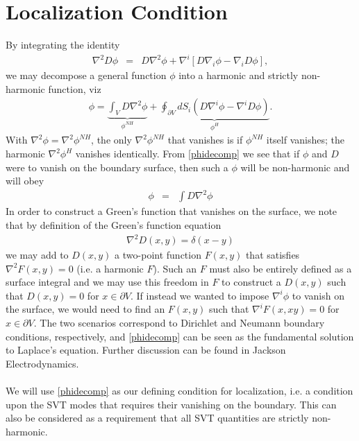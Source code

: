 \documentclass[10pt,letterpaper]{article}
\numberwithin{equation}{section}
\begin{document}
\section{Localization Condition}
By integrating the identity
\begin{eqnarray}
\nabla^2 D \phi &=& D\nabla^2 \phi + \nabla^i[D\nabla_i\phi-\nabla_i D\phi],
\end{eqnarray}
we may decompose a general function $\phi$ into a harmonic and strictly non-harmonic function, viz
\begin{eqnarray}
\phi =\underbrace{\int_V D \nabla^2 \phi}_{\phi^{NH}} + \underbrace{\oint_{\partial V} dS_i \left( D \nabla^i \phi - \nabla^i D \phi\right)}_{\phi^H}.
\label{phidecomp}
\end{eqnarray}
With $\nabla^2 \phi = \nabla^2 \phi^{NH}$, the only $\nabla^2\phi^{NH}$ that vanishes is if $\phi^{NH}$ itself vanishes; the harmonic $\nabla^2\phi^H$ vanishes identically. From \eqref{phidecomp} we see that if $\phi$ and $D$ were to vanish on the boundary surface, then such a $\phi$ will be non-harmonic and will obey
\begin{eqnarray}
\phi &=&\int D \nabla^2\phi
\label{localcondition}
\end{eqnarray}
In order to construct a Green's function that vanishes on the surface, we note that by definition of the Green's function equation
\begin{eqnarray}
\nabla^2 D(x,y) = \delta(x-y)
\end{eqnarray}
we may add to $D(x,y)$ a two-point function $F(x,y)$ that satisfies $\nabla^2 F(x,y) = 0$ (i.e. a harmonic $F$). Such an $F$ must also be entirely defined as a surface integral and  we may use this freedom in $F$ to construct a $D(x,y)$ such that $D(x,y)=0$ for $x\in \partial V$. If instead we wanted to impose $\nabla^i\phi$ to vanish on the surface, we would need to find an $F(x,y)$ such that $\nabla^i F(x,xy)=0$ for $x\in\partial V$. The two scenarios correspond to Dirichlet and Neumann boundary conditions, respectively, and \eqref{phidecomp} can be seen as the fundamental solution to Laplace's equation. Further discussion can be found in Jackson Electrodynamics. 
\\ \\
We will use \eqref{phidecomp} as our defining condition for localization, i.e. a condition upon the SVT modes that requires their vanishing on the boundary. This can also be considered as a requirement that all SVT quantities are strictly non-harmonic. 
%
%
%
%
%
%
%
\end{document}

